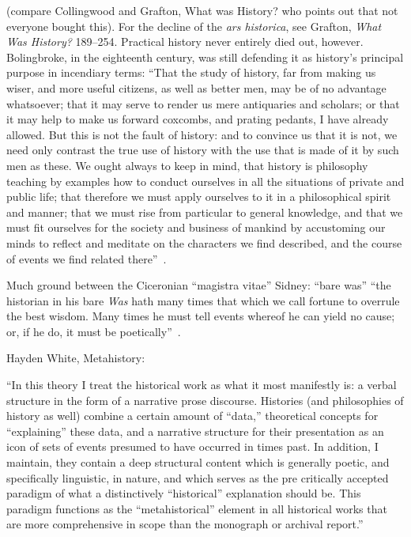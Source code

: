 (compare Collingwood and Grafton, What was History? who points out that not everyone bought this). For the decline of the \emph{ars historica}, see Grafton, \emph{What Was History?} 
189--254.\nocite{grafton_what_2007} Practical history never entirely died out, however. Bolingbroke, in the eighteenth century, was still defending it as history's principal purpose in incendiary terms: ``That the study of history, far from making us wiser, and more useful citizens, as well as better men, may be of no advantage whatsoever; that it may serve to render us mere antiquaries and scholars; or that it may help to make us forward coxcombs, and prating pedants, I have already allowed. But this is not the fault of history: and to convince us that it is not, we need only contrast the true use of history with the use that is made of it by such men as these. We ought always to keep in mind, that history is philosophy teaching by examples how to conduct ourselves in all the situations of private and public life; that therefore we must apply ourselves to it in a philosophical spirit and manner; that we must rise from particular to general knowledge, and that we must fit ourselves for the society and business of mankind by accustoming our minds to reflect and meditate on the characters we find described, and the course of events we find related there''~\cite[47--8]{bolingbroke_letters_1752}.

Much ground between the Ciceronian ``magistra vitae''
Sidney: ``bare was''
``the historian in his bare \emph{Was} hath many times that which we call fortune to overrule the best wisdom. Many times he must tell events whereof he can yield no cause; or, if he do, it must be poetically''~\cite[36]{sidney_defence_1966}.

Hayden White, Metahistory:

``In this theory I treat the historical work as what it most manifestly is: a verbal structure in the form of a narrative prose discourse. Histories (and philosophies of history as well) combine a certain amount of ``data,'' theoretical concepts for ``explaining'' these data, and a narrative structure for their presentation as an icon of sets of events presumed to have occurred in times past. In addition, I maintain, they contain a deep structural content which is generally poetic, and specifically linguistic, in nature, and which serves as the pre critically accepted paradigm of what a distinctively ``historical'' explanation should be. This paradigm functions as the ``metahistorical'' element in all historical works that are more comprehensive in scope than the monograph or archival report.''~\cite[ix]{white_metahistory:_1975}

